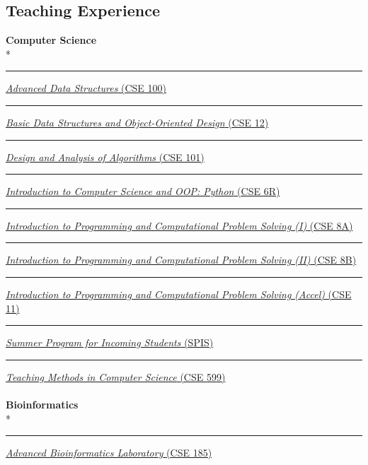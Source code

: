 \documentclass[margin,line]{res}
\begin{document}
\begin{resume}
\section{\sc Teaching Experience}
\textbf{Computer Science}\\*
\rule{-1mm}{5mm} \hspace*{4mm} \href{https://sites.google.com/a/eng.ucsd.edu/cse-100-winter-2016/}{\textit{Advanced Data Structures} (CSE 100)}\\
\rule{-1mm}{5mm} \hspace*{4mm} \href{http://ucsd.edu/catalog/courses/CSE.html#cse12}{\textit{Basic Data Structures and Object-Oriented Design} (CSE 12)}\\
\rule{-1mm}{5mm} \hspace*{4mm} \href{http://ucsd.edu/catalog/courses/CSE.html#cse101}{\textit{Design and Analysis of Algorithms} (CSE 101)}\\
\rule{-1mm}{5mm} \hspace*{4mm} \href{http://ucsd.edu/catalog/courses/CSE.html#cse6r}{\textit{Introduction to Computer Science and OOP: Python} (CSE 6R)}\\
\rule{-1mm}{5mm} \hspace*{4mm} \href{http://ucsd.edu/catalog/courses/CSE.html#cse8a}{\textit{Introduction to Programming and Computational Problem Solving (I)} (CSE 8A)}\\
\rule{-1mm}{5mm} \hspace*{4mm} \href{http://ucsd.edu/catalog/courses/CSE.html#cse8b}{\textit{Introduction to Programming and Computational Problem Solving (II)} (CSE 8B)}\\
\rule{-1mm}{5mm} \hspace*{4mm} \href{http://ucsd.edu/catalog/courses/CSE.html#cse11}{\textit{Introduction to Programming and Computational Problem Solving (Accel)} (CSE 11)}\\
\rule{-1mm}{5mm} \hspace*{4mm} \href{https://sites.google.com/a/eng.ucsd.edu/spis}{\textit{Summer Program for Incoming Students} (SPIS)}\\
\rule{-1mm}{5mm} \hspace*{4mm} \href{http://ucsd.edu/catalog/courses/CSE.html#cse599}{\textit{Teaching Methods in Computer Science} (CSE 599)}\\
~\\
\textbf{Bioinformatics}\\*
\rule{-1mm}{5mm} \hspace*{4mm} \href{http://www.ucsd.edu/catalog/courses/CSE.html#cse185}{\textit{Advanced Bioinformatics Laboratory} (CSE 185)}\\

\end{resume}
\end{document}
